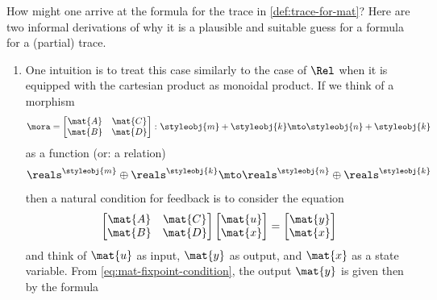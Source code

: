 \begin{remark}
    How might one arrive at the formula for the trace in \cref{def:trace-for-mat}? Here are two informal derivations of why it is a plausible and suitable guess for a formula for a (partial) trace.

    \begin{enumerate}
        \item
              One intuition is to treat this case similarly to the case of $\Rel$ when it is equipped with the cartesian product as monoidal product.
              If we think of a morphism
              \begin{equation}
                  \mora = \begin{bmatrix}
                      \mat{A} & \mat{C} \\
                      \mat{B} & \mat{D}
                  \end{bmatrix}
                  \colon \styleobj{m} + \styleobj{k}  \mto \styleobj{n} + \styleobj{k}
              \end{equation}
              as a function (or: a relation)
              \begin{equation}
                  \reals^\styleobj{m} \oplus \reals^\styleobj{k}  \mto \reals^\styleobj{n} \oplus \reals^\styleobj{k}
              \end{equation}
              then a natural condition for feedback is to consider the equation
              \begin{equation} \label{eq:mat-fixpoint-condition}
                  \begin{bmatrix}
                      \mat{A} & \mat{C} \\
                      \mat{B} & \mat{D}
                  \end{bmatrix}
                  \begin{bmatrix}
                      \mat{u} \\
                      \mat{x}
                  \end{bmatrix}
                  =
                  \begin{bmatrix}
                      \mat{y} \\
                      \mat{x}
                  \end{bmatrix}
              \end{equation}
              and think of $\mat{u}$ as input, $\mat{y}$ as output, and $\mat{x}$ as a state variable.
              From \cref{eq:mat-fixpoint-condition}, the output $\mat{y}$ is given then by the formula

\end{enumerate}
\end{remark}

